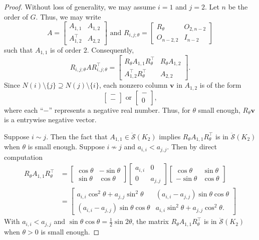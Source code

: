 \documentclass{article}
\theoremstyle{definition}
\newcommand{\trans}{^\top}
\newcommand{\bv}{\mathbf{v}}
\newcommand{\mdso}{\ddot{\mathcal{S}}}
\begin{document}
\begin{proof}
Without loss of generality, we may assume $i = 1$ and $j = 2$.  Let $n$ be the order of $G$.  Thus, we may write 
\[
    A = \begin{bmatrix}
        A_{1,1} & A_{1,2} \\
        A_{1,2}\trans & A_{2,2}
    \end{bmatrix}
    \text{ and }
    R_{i,j;\theta} = \begin{bmatrix}
        R_\theta & O_{2,n-2} \\
        O_{n-2,2} & I_{n-2}
    \end{bmatrix}
\]
such that $A_{1,1}$ is of order $2$.  Consequently, 
\[
    R_{i,j;\theta} A R_{i,j;\theta}\trans = \begin{bmatrix}
        R_\theta A_{1,1} R_\theta\trans & R_\theta A_{1,2} \\
        A_{1,2}\trans R_\theta\trans & A_{2,2}
    \end{bmatrix}.
\]
Since $N(i)\setminus\{j\} \supseteq N(j)\setminus\{i\}$, each nonzero column $\bv$ in $A_{1,2}$ is of the form
\[
    \begin{bmatrix} - \\ - \end{bmatrix}
    \text{ or } 
    \begin{bmatrix} - \\ 0 \end{bmatrix},
\] where each ``$-$'' represents a negative real number.
Thus, for $\theta$ small enough, $R_\theta \bv$ is a entrywise negative vector.  

Suppose $i \sim j$.  Then the fact that $A_{1,1}\in\mdso(K_2)$ implies $R_\theta A_{1,1} R_\theta\trans$ is in $\mdso(K_2)$ when $\theta$ is small enough.  Suppose $i \nsim j$ and $a_{i,i} < a_{j,j}$.  Then by direct computation
\[
    \begin{aligned}
    R_\theta A_{1,1} R_\theta\trans &= 
    \begin{bmatrix} \cos\theta & -\sin\theta \\ \sin\theta & \cos\theta \end{bmatrix}
    \begin{bmatrix} a_{i,i} & 0 \\ 0 & a_{j,j} \end{bmatrix}
    \begin{bmatrix} \cos\theta & \sin\theta \\ -\sin\theta & \cos\theta \end{bmatrix} \\
    &= \begin{bmatrix}
        a_{i,i}\cos^2\theta + a_{j,j}\sin^2\theta & (a_{i,i} - a_{j,j})\sin\theta\cos\theta \\
        (a_{i,i} - a_{j,j})\sin\theta\cos\theta & a_{i,i}\sin^2\theta + a_{j,j}\cos^2\theta. 
    \end{bmatrix}
    \end{aligned}
\]
With $a_{i,i} < a_{j,j}$ and $\sin\theta\cos\theta = \frac{1}{2}\sin 2\theta$, the matrix $R_\theta A_{1,1} R_\theta\trans$ is in $\mdso(K_2)$ when $\theta > 0$ is small enough.
\end{proof}
\end{document}
